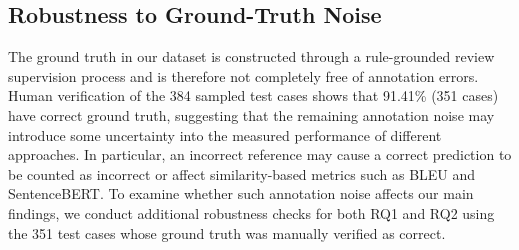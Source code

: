 \subsection{Robustness to Ground-Truth Noise}
\label{sec:supp:ground-truth-noise}






The ground truth in our dataset is constructed through a rule-grounded review supervision process and is therefore not completely free of annotation errors.
Human verification of the 384 sampled test cases shows that 91.41\% (351 cases) have correct ground truth, suggesting that the remaining annotation noise may introduce some uncertainty into the measured performance of different approaches.
In particular, an incorrect reference may cause a correct prediction to be counted as incorrect or affect similarity-based metrics such as BLEU and SentenceBERT.
To examine whether such annotation noise affects our main findings, we conduct additional robustness checks for both RQ1 and RQ2 using the 351 test cases whose ground truth was manually verified as correct.

